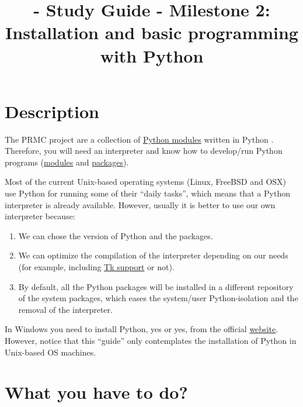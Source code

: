 
\title{\SM - Study Guide - Milestone 2: Installation and basic programming with Python}

\maketitle

\section{Description}

The PRMC project are a collection of
\href{https://docs.python.org/3/tutorial/modules.html#}{Python
  modules} written in Python \cite{Python}. Therefore, you will need
an interpreter and know how to develop/run Python programs
(\href{https://docs.python.org/3/tutorial/modules.html#modules}{modules}
and
\href{https://docs.python.org/3/tutorial/modules.html#packages}{packages}).

Most of the current Unix-based operating systems (Linux, FreeBSD and
OSX) use Python for running some of their ``daily tasks'', which means
that a Python interpreter is already available. However, usually it is
better to use our own interpreter because:

\begin{enumerate}

\item We can chose the version of Python and the packages.

\item We can optimize the compilation of the interpreter depending on
  our needs (for example, including
  \href{https://wiki.python.org/moin/TkInter}{Tk support} or not).

\item By default, all the Python packages will be installed in a
  different repository of the system packages, which eases the
  system/user Python-isolation and the removal of the interpreter.

\end{enumerate}

In Windows you need to install Python, yes or yes, from the official
\href{https://www.python.org/downloads/}{website}. However, notice
that this ``guide'' only contemplates the installation of Python in
Unix-based OS machines.

\section{What you have to do?}

